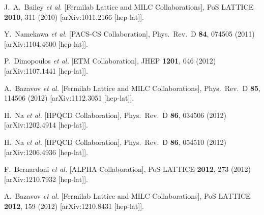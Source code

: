 \begin{thebibliography}{99}
  J.~A.~Bailey {\it et al.}  [Fermilab Lattice and MILC Collaborations],
  PoS LATTICE {\bf 2010}, 311 (2010)
  [arXiv:1011.2166 [hep-lat]].
  
  Y.~Namekawa {\it et al.}  [PACS-CS Collaboration],
  Phys.\ Rev.\ D {\bf 84}, 074505 (2011)
  [arXiv:1104.4600 [hep-lat]].
  
  P.~Dimopoulos {\it et al.}  [ETM Collaboration],
  JHEP {\bf 1201}, 046 (2012)
  [arXiv:1107.1441 [hep-lat]].
  
  A.~Bazavov {\it et al.}  [Fermilab Lattice and MILC Collaborations],
  Phys.\ Rev.\ D {\bf 85}, 114506 (2012)
  [arXiv:1112.3051 [hep-lat]].
  
  H.~Na {\it et al.} [HPQCD Collaboration],
  Phys.\ Rev.\ D {\bf 86}, 034506 (2012)
  [arXiv:1202.4914 [hep-lat]].
  
  H.~Na {\it et al.} [HPQCD Collaboration],
  Phys.\ Rev.\ D {\bf 86}, 054510 (2012)
  [arXiv:1206.4936 [hep-lat]].
  
  F.~Bernardoni {\it et al.} [ALPHA Collaboration],
  PoS LATTICE {\bf 2012}, 273 (2012)
  [arXiv:1210.7932 [hep-lat]].
  
  A.~Bazavov {\it et al.}  [Fermilab Lattice and MILC Collaborations],
  PoS LATTICE {\bf 2012}, 159 (2012)
  [arXiv:1210.8431 [hep-lat]].
  

\end{thebibliography}
